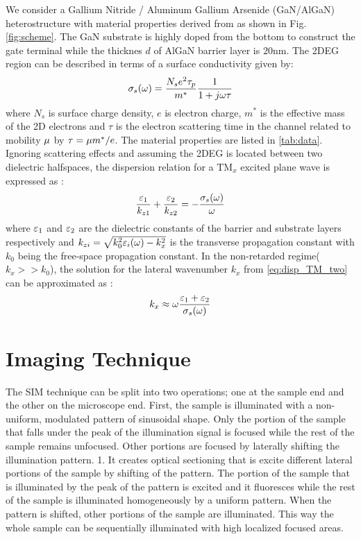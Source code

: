 \documentclass[11pt]{article}
\begin{document}
We consider a Gallium Nitride / Aluminum Gallium Arsenide (GaN/AlGaN) heterostructure with material properties derived from \cite{Muravjov_2010} as shown in Fig. \ref{fig:scheme}. The GaN substrate is highly doped from the bottom to construct the gate terminal while the thicknes $d$ of AlGaN barrier layer is $20 \mathrm{nm}$. The 2DEG region can be described in terms of a surface conductivity given by:
\begin{equation}
  \sigma_s(\omega) = \frac{N_s e^2 \tau_{p}}{m^{\ast}}\frac{1}{1 + j \omega \tau}
  \label{eq:conductivity}
\end{equation}
%
where $N_s$ is surface charge density, $e$ is electron charge, $m^{\ast}$ is the effective mass of the 2D electrons and $\tau$ is the electron scattering time in the channel related to mobility $\mu$ by $\tau = \mu m^{\ast}/e$. The material properties are listed in \ref{tab:data}. Ignoring scattering effects and assuming the 2DEG is located between two dielectric halfspaces, the dispersion relation for a $\mathrm{TM}_x$ excited plane wave is expressed as \cite{Nakayama_1974}:
%
\begin{equation}
  \frac{\varepsilon_1}{k_{z1}} + \frac{\varepsilon_2}{k_{z2}} = -\frac{\sigma_s(\omega)}{\omega}
  \label{eq:disp_TM_two}
\end{equation}
%
where $\varepsilon_1$ and $\varepsilon_2$ are the dielectric constants of the barrier and substrate layers respectively and $k_{zi} = \sqrt{k_0^2 \varepsilon_i(\omega) -  k_x^2}$ is the transverse propagation constant with $k_0$ being the free-space propagation constant. In the non-retarded regime($k_x >> k_0$), the solution for the lateral wavenumber $k_x$ from \eqref{eq:disp_TM_two} can be approximated as \cite{Jablan_2009}:
%
\begin{equation}
  k_x \approx \omega \frac{\varepsilon_1 + \varepsilon_2}{\sigma_s(\omega)}
  \label{eq:disl_sol}
\end{equation}
%



\section{Imaging Technique}
%
The SIM technique can be split into two operations; one at the sample end and the other on the microscope end. First, the sample is illuminated with a non-uniform, modulated pattern of sinusoidal shape. Only the portion of the sample that falls under the peak of the illumination signal is focused while the rest of the sample remains unfocused. Other portions are focused by laterally shifting the illumination pattern.
1. It creates optical sectioning that is excite different lateral portions of the sample by shifting of the pattern. The portion of the sample that is illuminated by the peak of the pattern is excited and it fluoresces while the rest of the sample is illuminated homogeneously by a uniform pattern. When the pattern is shifted, other portions of the sample are illuminated. This way the whole sample can be sequentially illuminated with high localized focused areas.
\end{document}
